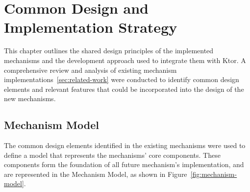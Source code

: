 \chapter{Common Design and Implementation Strategy}\label{ch:design-implementation}

This chapter outlines the shared design principles of the implemented mechanisms and the development approach used to integrate them with Ktor.
A comprehensive review and analysis of existing mechanism implementations~\ref{sec:related-work} were conducted
to identify common design elements and relevant features that could be incorporated into the design of the new mechanisms.


\section{Mechanism Model}\label{sec:mechanism-model}

The common design elements identified in the existing mechanisms were used
to define a model that represents the mechanisms' core components.
These components form the foundation of all future mechanism's implementation, and are represented in the Mechanism Model, as shown in Figure~\ref{fig:mechanism-model}.

